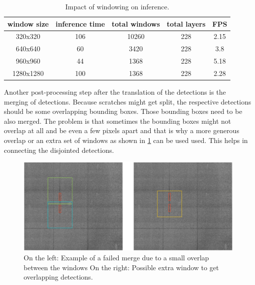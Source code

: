 \begin{table}
\centering
\begin{tabular}{ ||c|c|c|c|c||}
\hline
window size & inference time & total windows & total layers & FPS\\ [0.5ex]
\hline\hline
320x320 & 106 & 10260 & 228 & 2.15 \\
640x640 & 60 & 3420 & 228 & 3.8 \\
960x960 & 44 & 1368  & 228 & 5.18 \\
1280x1280 & 100 & 1368 & 228 & 2.28 \\
\hline
\end{tabular}
\caption{Impact of windowing on inference.}
\label{impl:win_inference}
\end{table}

Another post-processing step after the translation of the detections is the merging of detections. Because scratches might get split, the respective detections should be some overlapping bounding boxes. Those bounding boxes need to be also merged. The problem is that sometimes the bounding boxes might not overlap at all and be even a few pixels apart and that is why a more generous overlap or an extra set of windows as shown in \ref{impl:extra_win} can be used used. This helps in connecting the disjointed detections. \\

\begin{figure}[!h]
\centering
\captionsetup{justification=centering,margin=2cm}
\includegraphics[width=\columnwidth]{images/implementation/extra_windows}
\caption{On the left: Example of a failed merge due to a small overlap between the windows On the right: Possible extra window to get overlapping detections. }
\label{impl:extra_win}
\end{figure}

